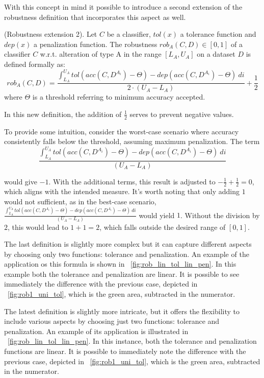 With this concept in mind it possible to introduce a second extension of the robustness definition that incorporates this aspect as well.

\begin{definition}\label{def:rob2} (Robustness extension 2).
	Let $C$ be a classifier, $tol(x)$ a tolerance function and $dep(x)$ a penalization function.
	The robustness $rob_A(C,D) \in [0,1]$ of a classifier $C$ w.r.t. alteration of type A in the range $[L_A, U_A]$ on a dataset $D$ is defined formally as:
	\[
		rob_A(C,D) = \frac{\int_{L_A}^{U_A} tol(acc(C,D^{A_i}) - \Theta) - dep(acc(C,D^{A_i}) - \Theta)\ di}{2 \cdot (U_A - L_A)} + \frac{1}{2}
	\]
	where $\Theta$ is a threshold referring to minimum accuracy accepted.
\end{definition}

In this new definition, the addition of $\frac{1}{2}$ serves to prevent negative values.

To provide some intuition, consider the worst-case scenario where accuracy consistently falls below the threshold, assuming maximum penalization.
The term 
\[
	\frac{\int_{L_A}^{U_A} tol(acc(C,D^{A_i}) - \Theta) - dep(acc(C,D^{A_i}) - \Theta)\ di}{(U_A - L_A)}
\] 

would give $-1$. With the additional terms, this result is adjusted to $-\frac{1}{2} + \frac{1}{2} = 0$, which aligns with the intended measure.
It's worth noting that only adding $1$ would not sufficient, as in the best-case scenario, $\frac{\int_{L_A}^{U_A} tol(acc(C,D^{A_i}) - \Theta) - dep(acc(C,D^{A_i}) - \Theta)\ di}{(U_A - L_A)}$ would yield $1$.
Without the division by $2$, this would lead to $1 + 1 = 2$, which falls outside the desired range of $[0, 1]$.

The last definition is slightly more complex but it can capture different aspects by choosing only two functions: tolerance and penalization. An example of the application os this formula is shown in \Fig~\ref{fig:rob_lin_tol_lin_pen}. In this example both the tolerance and penalization are linear. It is possible to see immediately the difference with the previous case, depicted in \Fig~\ref{fig:rob1_uni_tol}, which is the green area, subtracted in the numerator. 

The latest definition is slightly more intricate, but it offers the flexibility to include various aspects by choosing just two functions: tolerance and penalization. An example of its application is illustrated in \Fig~\ref{fig:rob_lin_tol_lin_pen}. In this instance, both the tolerance and penalization functions are linear. It is possible to immediately note the difference with the previous case, depicted in \Fig~\ref{fig:rob1_uni_tol}, which is the green area, subtracted in the numerator. 

